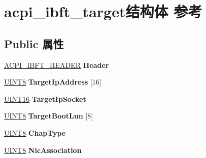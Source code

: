 \hypertarget{structacpi__ibft__target}{}\section{acpi\+\_\+ibft\+\_\+target结构体 参考}
\label{structacpi__ibft__target}
\subsection*{Public 属性}
\begin{DoxyCompactItemize}
\item 
\mbox{\label{structacpi__ibft__target_ab9661eb7b024fe1a6286ff7e8daafe1d}} 
\hyperlink{structacpi__ibft__header}{A\+C\+P\+I\+\_\+\+I\+B\+F\+T\+\_\+\+H\+E\+A\+D\+ER} {\bfseries Header}
\item 
\mbox{\label{structacpi__ibft__target_af2af2a8f33ceb8415bf40aaee9c04a64}} 
\hyperlink{_processor_bind_8h_ab27e9918b538ce9d8ca692479b375b6a}{U\+I\+N\+T8} {\bfseries Target\+Ip\+Address} \mbox{[}16\mbox{]}
\item 
\mbox{\label{structacpi__ibft__target_aab21f5fa20efd7dde0b3a7a9e55e0d37}} 
\hyperlink{_processor_bind_8h_a09f1a1fb2293e33483cc8d44aefb1eb1}{U\+I\+N\+T16} {\bfseries Target\+Ip\+Socket}
\item 
\mbox{\label{structacpi__ibft__target_aef6b0f295c51ce89ca3478dacc952594}} 
\hyperlink{_processor_bind_8h_ab27e9918b538ce9d8ca692479b375b6a}{U\+I\+N\+T8} {\bfseries Target\+Boot\+Lun} \mbox{[}8\mbox{]}
\item 
\mbox{\label{structacpi__ibft__target_a30a4dfdd68e0c4245172faeaf1b0a7f4}} 
\hyperlink{_processor_bind_8h_ab27e9918b538ce9d8ca692479b375b6a}{U\+I\+N\+T8} {\bfseries Chap\+Type}
\item 
\mbox{\label{structacpi__ibft__target_a9212a07660f09e6ad87ad5beb78eea4a}} 
\hyperlink{_processor_bind_8h_ab27e9918b538ce9d8ca692479b375b6a}{U\+I\+N\+T8} {\bfseries Nic\+Association}
\item 
\mbox{\label{structacpi__ibft__target_a32f829562e4865126c270411846a81a8}} 

\end{DoxyCompactItemize}
